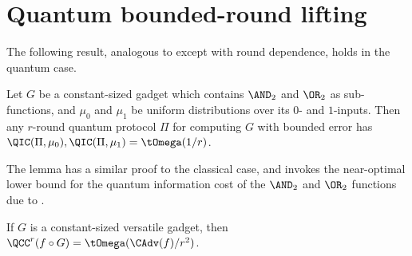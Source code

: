 \section{Quantum bounded-round lifting}

The following result, analogous to  except with round dependence, holds in the quantum case.

\begin{lemma}\label{lem:ANDOR-quantum}
Let $G$ be a constant-sized gadget which contains
$\AND_2$ and $\OR_2$ as sub-functions, and $\mu_0$ and $\mu_1$ be uniform distributions over its $0$- and $1$-inputs.
Then any $r$-round quantum protocol $\Pi$ for computing $G$
with bounded error has
$\QIC(\Pi,\mu_0), \QIC(\Pi,\mu_1) = \tOmega(1/r)$.
\end{lemma}

The lemma has a similar proof to the classical case, and invokes the near-optimal lower bound for the quantum information
cost of the $\AND_2$ and $\OR_2$ functions due to \cite{BGK+18}.

\begin{theorem}
If $G$ is a constant-sized versatile gadget,
then $\QCC^r(f\circ G) = \tOmega(\CAdv(f)/r^2)$.
\end{theorem}

